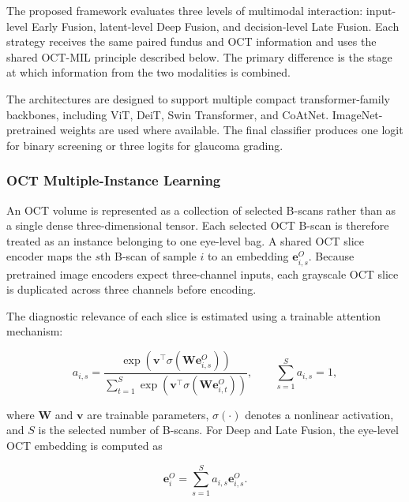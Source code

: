 \documentclass[preprint,12pt]{elsarticle}
\begin{document}
The proposed framework evaluates three levels of multimodal interaction: input-level Early Fusion, latent-level Deep Fusion, and decision-level Late Fusion. Each strategy receives the same paired fundus and OCT information and uses the shared OCT-MIL principle described below. The primary difference is the stage at which information from the two modalities is combined.

The architectures are designed to support multiple compact transformer-family backbones, including ViT, DeiT, Swin Transformer, and CoAtNet. ImageNet-pretrained weights are used where available. The final classifier produces one logit for binary screening or three logits for glaucoma grading.

\subsubsection{OCT Multiple-Instance Learning}
\label{subsubsec:oct_mil}

An OCT volume is represented as a collection of selected B-scans rather than as a single dense three-dimensional tensor. Each selected OCT B-scan is therefore treated as an instance belonging to one eye-level bag. A shared OCT slice encoder maps the $s$th B-scan of sample $i$ to an embedding $\mathbf{e}_{i,s}^{O}$. Because pretrained image encoders expect three-channel inputs, each grayscale OCT slice is duplicated across three channels before encoding.

The diagnostic relevance of each slice is estimated using a trainable attention mechanism:

\begin{equation}
    a_{i,s} =
    \frac{
        \exp\!\left(
        \mathbf{v}^{\top}
        \sigma\!\left(\mathbf{W}\mathbf{e}_{i,s}^{O}\right)
        \right)
    }{
        \sum_{t=1}^{S}
        \exp\!\left(
        \mathbf{v}^{\top}
        \sigma\!\left(\mathbf{W}\mathbf{e}_{i,t}^{O}\right)
        \right)
    },
    \qquad
    \sum_{s=1}^{S}a_{i,s}=1,
    \label{eq:mil_attention}
\end{equation}

where $\mathbf{W}$ and $\mathbf{v}$ are trainable parameters, $\sigma(\cdot)$ denotes a nonlinear activation, and $S$ is the selected number of B-scans. For Deep and Late Fusion, the eye-level OCT embedding is computed as

\begin{equation}
    \mathbf{e}_{i}^{O}
    =
    \sum_{s=1}^{S}
    a_{i,s}\mathbf{e}_{i,s}^{O}.
    \label{eq:mil_embedding}
\end{equation}
\end{document}
